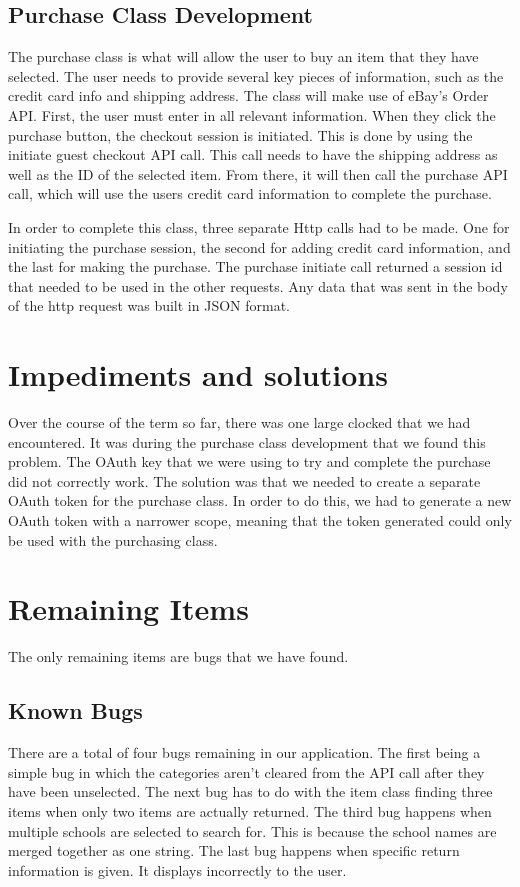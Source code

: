 \documentclass[journal,compsoc, 10pt, draftclsnofoot, onecolumn]{IEEEtran}
\begin{document}
\subsection{Purchase Class Development}
The purchase class is what will allow the user to buy an item that they have selected. 
The user needs to provide several key pieces of information, such as the credit card 
info and shipping address. The class will make use of eBay's Order API. First, the 
user must enter in all relevant information. When they click the purchase 
button, the checkout session is initiated. This is done by using the initiate 
guest checkout API call. This call needs to have the shipping address as well as 
the ID of the selected item. From there, it will then call the purchase API call, 
which will use the users credit card information to complete the purchase. \newline

In order to complete this class, three separate Http calls had to be made. One for 
initiating the purchase session, the second for adding credit card information, and 
the last for making the purchase. The purchase initiate call returned a session id that 
needed to be used in the other requests. Any data that was sent in the body of the 
http request was built in JSON format. 

\section{Impediments and solutions}
Over the course of the term so far, there was one large clocked that we 
had encountered. It was during the purchase class development that we found 
this problem. The OAuth key that we were using to try and complete the purchase 
did not correctly work. The solution was that we needed to create a separate OAuth 
token for the purchase class. In order to do this, we had to generate a new OAuth 
token with a narrower scope, meaning that the token generated could only be used 
with the purchasing class.

\section{Remaining Items}
The only remaining items are bugs that we have found.

\subsection{Known Bugs}
There are a total of four bugs remaining in our application. The first being a simple 
bug in which the categories aren't cleared from the API call after they have been 
unselected. The next bug has to do with the item class finding three items when 
only two items are actually returned. The third bug happens when multiple schools 
are selected to search for. This is because the school names are merged together 
as one string. The  last bug happens when specific return information is given. It 
displays incorrectly to the user.\newpage
\end{document}
